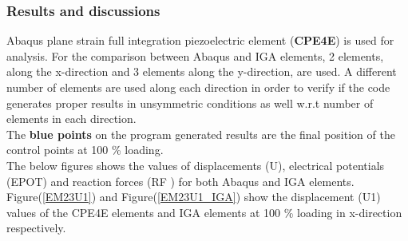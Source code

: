 \documentclass[11pt]{article}
\begin{document}
\subsubsection{Results and discussions}
Abaqus plane strain full integration piezoelectric element (\textbf{CPE4E}) is used for analysis. For the comparison between Abaqus and IGA elements, 2 elements, along the x-direction and 3 elements along the y-direction, are used. A different number of elements are used along each direction in order to verify if the code generates proper results in unsymmetric conditions as well w.r.t number of elements in each direction.\\
The \textbf{blue points} on the program generated results are the final position of the control points at 100 \% loading.\\
The below figures shows the values of displacements (U), electrical potentials (EPOT) and reaction forces (RF ) for both Abaqus and IGA elements.\\
Figure(\ref{EM23U1}) and Figure(\ref{EM23U1_IGA}) show the displacement (U1) values of the CPE4E elements and IGA elements at 100 \% loading in x-direction respectively. \\
\end{document}

